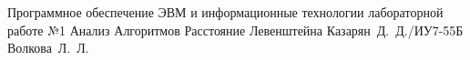 \documentclass{bmstu}
\begin{document}
	
	{Программное обеспечение ЭВМ и информационные технологии}
	{лабораторной работе №1}
	{Анализ Алгоритмов}
	{Расстояние Левенштейна}
	{}
	{Казарян~Д.~Д./ИУ7-55Б}
	{Волкова~Л.~Л.}
	
	\maketableofcontents
	
	
	
	
	
	
	
	
	\makebibliography
	
	
	
\end{document}
